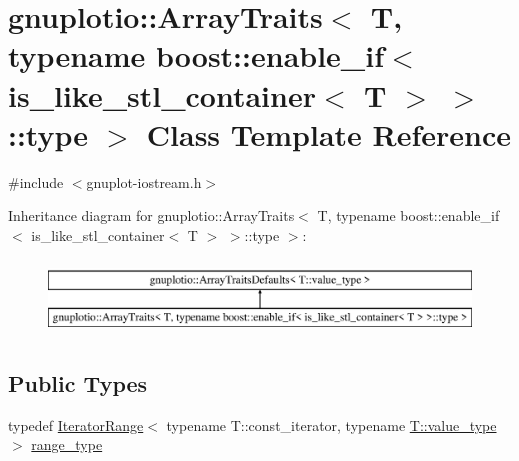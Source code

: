 \hypertarget{classgnuplotio_1_1_array_traits_3_01_t_00_01typename_01boost_1_1enable__if_3_01is__like__stl__co9e1736bbd08cd58c6993ab613a998887}{}\section{gnuplotio\+:\+:Array\+Traits$<$ T, typename boost\+:\+:enable\+\_\+if$<$ is\+\_\+like\+\_\+stl\+\_\+container$<$ T $>$ $>$\+:\+:type $>$ Class Template Reference}
\label{classgnuplotio_1_1_array_traits_3_01_t_00_01typename_01boost_1_1enable__if_3_01is__like__stl__co9e1736bbd08cd58c6993ab613a998887}


{\ttfamily \#include $<$gnuplot-\/iostream.\+h$>$}

Inheritance diagram for gnuplotio\+:\+:Array\+Traits$<$ T, typename boost\+:\+:enable\+\_\+if$<$ is\+\_\+like\+\_\+stl\+\_\+container$<$ T $>$ $>$\+:\+:type $>$\+:\begin{figure}[H]
\begin{center}
\leavevmode
\includegraphics[height=2.000000cm]{classgnuplotio_1_1_array_traits_3_01_t_00_01typename_01boost_1_1enable__if_3_01is__like__stl__co9e1736bbd08cd58c6993ab613a998887}
\end{center}
\end{figure}
\subsection*{Public Types}
\begin{DoxyCompactItemize}
\item 
typedef \hyperlink{classgnuplotio_1_1_iterator_range}{Iterator\+Range}$<$ typename T\+::const\+\_\+iterator, typename \hyperlink{classgnuplotio_1_1_array_traits_a3bcae12a7bf42af90f4946acc66f27e0}{T\+::value\+\_\+type} $>$ \hyperlink{classgnuplotio_1_1_array_traits_3_01_t_00_01typename_01boost_1_1enable__if_3_01is__like__stl__co9e1736bbd08cd58c6993ab613a998887_ab702072abbe018bbc90b9967ca8c4b42}{range\+\_\+type}
\end{DoxyCompactItemize}
